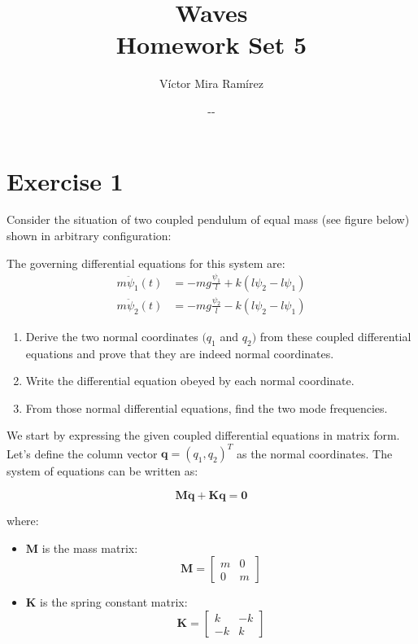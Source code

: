 \documentclass{article}
\title{\Huge{Waves\\Homework Set 5}}
\author{Víctor Mira Ramírez}
\date{\number\month -\number\day -\number\year}
\newcommand{\pregunta}[1]{\begin{note}#1\end{note}}
\begin{document}
\maketitle
\clearpage

\section*{Exercise 1}
\pregunta{
Consider the situation of two coupled pendulum of equal mass (see figure below) shown in arbitrary configuration:

The governing differential equations for this system are:
\begin{align}
    m \ddot{\psi}_1(t) &= -m g \frac{\psi_1}{l} + k(l \psi_2 - l \psi_1) \\
    m \ddot{\psi}_2(t) &= -m g \frac{\psi_2}{l} - k(l \psi_2 - l \psi_1)
\end{align}

\begin{enumerate}[label=\alph*.]
\item Derive the two normal coordinates $(q_1$ and $q_2)$ from these coupled differential equations and prove that they are indeed normal coordinates.

\item Write the differential equation obeyed by each normal coordinate.

\item From those normal differential equations, find the two mode frequencies.
\end{enumerate}}
   \noindent We start by expressing the given coupled differential equations in matrix form. Let's define the column vector \(\mathbf{q} = (q_1, q_2)^T\) as the normal coordinates. The system of equations can be written as:

   \[
   \mathbf{M} \mathbf{\ddot{q}} + \mathbf{K} \mathbf{q} = \mathbf{0}
   \]

   where:
   \begin{itemize}
        \item \(\mathbf{M}\) is the mass matrix:
     \[
     \mathbf{M} = \begin{bmatrix} m & 0 \\ 0 & m \end{bmatrix}
     \]
        \item \(\mathbf{K}\) is the spring constant matrix:
     \[
     \mathbf{K} = \begin{bmatrix} k & -k \\ -k & k \end{bmatrix}
     \]
    \end{itemize}
\end{document}
